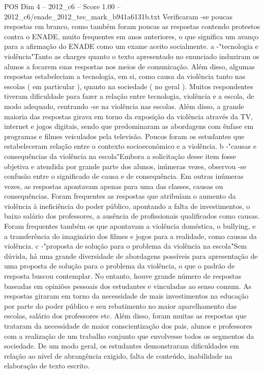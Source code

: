 \begin{textsample}{POS Dim 4 – 2012\_c6 – Score 1.00 – 2012\_c6/enade\_2012\_tec\_mark\_b941a6131b.txt}
Verificaram -se poucas respostas em branco, como também foram poucas as respostas contendo protestos contra o ENADE, muito frequentes em anos anteriores, o que significa um avanço para a afirmação do ENADE como um exame aceito socialmente. a -"tecnologia e violência"Tanto as charges quanto o texto apresentado no enunciado induziram os alunos a focarem suas respostas nos meios de comunicação.
Além disso, algumas respostas estabeleciam a tecnologia, em si, como causa da violência tanto nas escolas ( em particular ), quanto na sociedade ( no geral ).
Muitos respondentes tiveram dificuldade para fazer a relação entre tecnologia, violência e a escola, de modo adequado, centrando -se na violência nas escolas.
Além disso, a grande maioria das respostas girava em torno da exposição da violência através da TV, internet e jogos digitais, sendo que predominaram as abordagens com ênfase em programas e filmes veiculados pela televisão.
Poucos foram os estudantes que estabeleceram relação entre o contexto socioeconômico e a violência. b -"causas e consequências da violência na escola"Embora a solicitação desse item fosse objetiva e atendida por grande parte dos alunos, inúmeras vezes, observou -se confusão entre o significado de causa e de consequência.
Em outras inúmeras vezes, as respostas apontavam apenas para uma das classes, causas ou consequências.
Foram frequentes as respostas que atribuíam o aumento da violência à ineficiência do poder público, apontando a falta de investimentos, o baixo salário dos professores, a ausência de profissionais qualificados como causas.
Foram frequentes também os que apontavam a violência doméstica, o bullying, e a transferência do imaginário dos filmes e jogos para a realidade, como causas da violência. c -"proposta de solução para o problema da violência na escola"Sem dúvida, há uma grande diversidade de abordagens possíveis para apresentação de uma proposta de solução para o problema da violência, o que o padrão de resposta buscou contemplar.
No entanto, houve grande número de respostas baseadas em opiniões pessoais dos estudantes e vinculadas ao senso comum.
As respostas giraram em torno da necessidade de mais investimentos na educação por parte do poder público e seu rebatimento no maior aparelhamento das escolas, salário dos professores etc.
Além disso, foram muitas as respostas que trataram da necessidade de maior conscientização dos pais, alunos e professores com a realização de um trabalho conjunto que envolvesse todos os segmentos da sociedade.
De um modo geral, os estudantes demonstraram dificuldades em relação ao nível de abrangência exigido, falta de conteúdo, inabilidade na elaboração de texto escrito.

\end{textsample}
